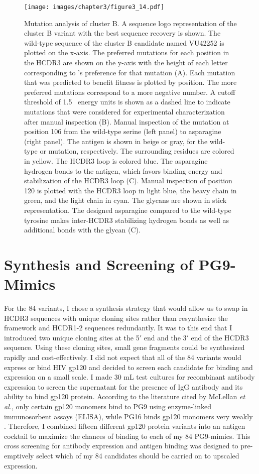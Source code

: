 \begin{figure}
   \centering
   \texttt{[image: images/chapter3/figure3\_14.pdf]} %
   \caption[Mutation Analysis of Cluster B]{Mutation analysis of cluster B. A sequence logo representation of the cluster B variant with the best sequence recovery is shown. The wild-type sequence of the cluster B candidate named VU42252 is plotted on the x-axis. The preferred mutations for each position in the HCDR3 are shown on the y-axis with the height of each letter corresponding to \rosetta's preference for that mutation (A). Each mutation that was predicted to benefit fitness is plotted by position. The more preferred mutations correspond to a more negative number. A cutoff threshold of 1.5 \rosetta~energy units is shown as a dashed line to indicate mutations that were considered for experimental characterization after manual inspection (B). Manual inspection of the mutation at position 106 from the wild-type serine (left panel) to asparagine (right panel). The antigen is shown in beige or gray, for the wild-type or mutation, respectively. The surrounding residues are colored in yellow. The HCDR3 loop is colored blue. The asparagine hydrogen bonds to the antigen, which favors binding energy and stabilization of the HCDR3 loop (C). Manual inspection of position 120 is plotted with the HCDR3 loop in light blue, the heavy chain in green, and the light chain in cyan. The glycans are shown in stick representation. The designed asparagine compared to the wild-type tyrosine makes inter-HCDR3 stabilizing hydrogen bonds as well as additional bonds with the glycan (C).}
   \label{fig:figure3_14}
\end{figure}

\section{Synthesis and Screening of PG9-Mimics}
For the 84 variants, I chose a synthesis strategy that would allow us to swap in HCDR3 sequences with unique cloning sites rather than resynthesize the framework and HCDR1-2 sequences redundantly. It was to this end that I introduced two unique cloning sites at the 5$'$ end and the 3$'$ end of the HCDR3 sequence. Using these cloning sites, small gene fragments could be synthesized rapidly and cost-effectively.  I did not expect that all of the 84 variants would express or bind HIV gp120 and decided to screen each candidate for binding and expression on a small scale.  I made 30 mL test cultures for recombinant antibody expression to screen the supernatant for the presence of IgG antibody and its ability to bind gp120 protein. According to the literature cited by McLellan \textit{et al.}, only certain gp120 monomers bind to PG9 using enzyme-linked immunosorbent assays (ELISA), while PG16 binds gp120 monomers very weakly  \citep{McLellan:2011dg}. Therefore, I combined fifteen different gp120 protein variants into an antigen cocktail to maximize the chances of binding to each of my 84 PG9-mimics. This cross screening for antibody expression and antigen binding was designed to pre-emptively select which of my 84 candidates should be carried on to upscaled expression.

